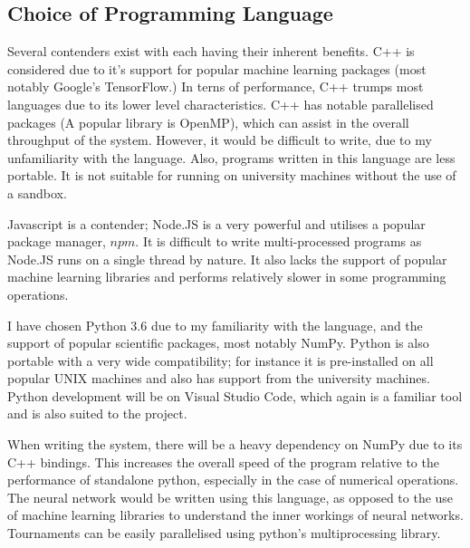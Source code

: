 \documentclass[12pt,a4paper]{article}
\begin{document}
\subsection*{Choice of Programming Language}

    Several contenders exist with each having their inherent benefits. C++ is considered due to it's support for popular machine learning packages (most notably Google's TensorFlow.) In terns of performance, C++ trumps most languages due to its lower level characteristics. C++ has notable parallelised packages (A popular library is OpenMP), which can assist in the overall throughput of the system. However, it would be difficult to write, due to my unfamiliarity with the language. Also, programs written in this language are less portable. It is not suitable for running on university machines without the use of a sandbox.

    Javascript is a contender; Node.JS is a very powerful and utilises a popular package manager, $npm$. It is difficult to write multi-processed programs as Node.JS runs on a single thread by nature. It also lacks the support of popular machine learning libraries and performs relatively slower in some programming operations.

    I have chosen Python 3.6 due to my familiarity with the language, and the support of popular scientific packages, most notably NumPy. Python is also portable with a very wide compatibility; for instance it is pre-installed on all popular UNIX machines and also has support from the university machines. Python development will be on Visual Studio Code, which again is a familiar tool and is also suited to the project.

    When writing the system, there will be a heavy dependency on NumPy due to its C++ bindings. This increases the overall speed of the program relative to the performance of standalone python, especially in the case of numerical operations. The neural network would be written using this language, as opposed to the use of machine learning libraries to understand the inner workings of neural networks. Tournaments can be easily parallelised using python's multiprocessing library.
\end{document}
